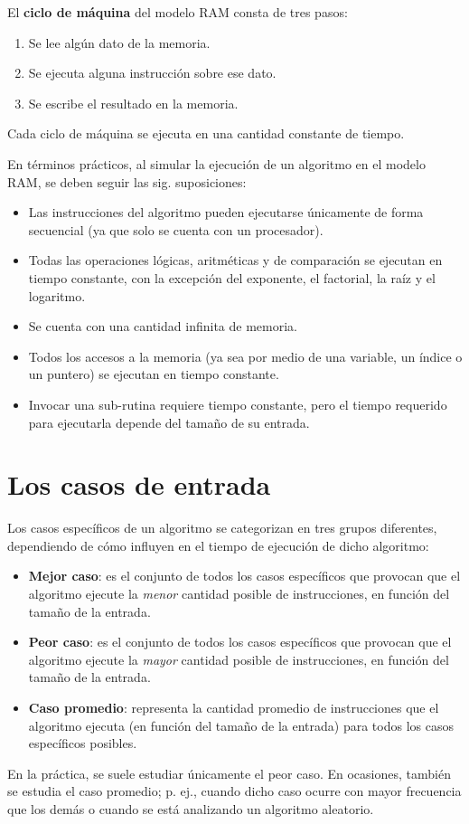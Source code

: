 El \textbf{ciclo de máquina} del modelo RAM consta de tres pasos: 
\begin{enumerate}
  \item Se lee algún dato de la memoria. 
  \item Se ejecuta alguna instrucción sobre ese dato.
  \item Se escribe el resultado en la memoria. 
\end{enumerate}
Cada ciclo de máquina se ejecuta en una cantidad constante de tiempo.

En términos prácticos, al simular la ejecución de un algoritmo en
el modelo RAM, se deben seguir las sig. suposiciones:
\begin{itemize}
  \item Las instrucciones del algoritmo pueden ejecutarse únicamente de forma secuencial (ya que solo se cuenta con un procesador). 
  \item Todas las operaciones lógicas, aritméticas y de comparación se ejecutan en tiempo constante, con la excepción del exponente, el factorial, la raíz y el logaritmo.
  \item Se cuenta con una cantidad infinita de memoria. 
  \item Todos los accesos a la memoria (ya sea por medio de una variable, un índice o un puntero) se ejecutan en tiempo constante. 
  \item Invocar una sub-rutina requiere tiempo constante, pero el tiempo requerido para ejecutarla depende del tamaño de su entrada.
\end{itemize}

\section{Los casos de entrada}

Los casos específicos de un algoritmo se categorizan en tres grupos diferentes, dependiendo de cómo influyen en el tiempo de ejecución de dicho algoritmo:
\begin{itemize}
  \item \textbf{Mejor caso}: es el conjunto de todos los casos específicos que provocan que el algoritmo ejecute la \emph{menor} cantidad posible de instrucciones, en función del tamaño de la entrada.
  \item \textbf{Peor caso}: es el conjunto de todos los casos específicos que provocan que el algoritmo ejecute la \emph{mayor} cantidad posible de instrucciones, en función del tamaño de la entrada. 
  \item \textbf{Caso promedio}: representa la cantidad promedio de instrucciones
  que el algoritmo ejecuta (en función del tamaño de la entrada) para todos los casos específicos posibles. 
\end{itemize}
En la práctica, se suele estudiar únicamente el peor caso. 
En ocasiones, también se estudia el caso promedio; p. ej., cuando dicho caso ocurre con mayor frecuencia que los demás o cuando se está analizando un algoritmo aleatorio.

